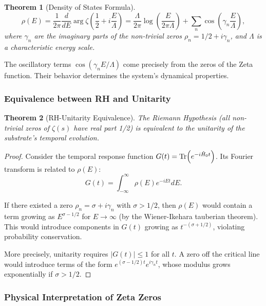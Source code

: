 \documentclass[11pt, a4paper]{article}
\theoremstyle{plain}
\newtheorem{theorem}{Theorem}[section]
\theoremstyle{definition}
\begin{document}
\begin{theorem}[Density of States Formula]
\begin{equation}
\rho(E) = \frac{1}{2\pi} \frac{d}{dE} \arg \zeta\left(\frac{1}{2} + i\frac{E}{\Lambda}\right) = \frac{\Lambda}{2\pi} \log\left(\frac{E}{2\pi\Lambda}\right) + \sum_n \cos\left(\gamma_n \frac{E}{\Lambda}\right),
\label{eq:density_of_states}
\end{equation}
where $\gamma_n$ are the imaginary parts of the non-trivial zeros $\rho_n = 1/2 + i\gamma_n$, and $\Lambda$ is a characteristic energy scale.
\end{theorem}

The oscillatory terms $\cos(\gamma_n E/\Lambda)$ come precisely from the zeros of the Zeta function. Their behavior determines the system's dynamical properties.

\subsubsection{Equivalence between RH and Unitarity}

\begin{theorem}[RH-Unitarity Equivalence]
The Riemann Hypothesis (all non-trivial zeros of $\zeta(s)$ have real part 1/2) is equivalent to the unitarity of the substrate's temporal evolution.
\end{theorem}

\begin{proof}
Consider the temporal response function $G(t) = \Tr(e^{-i\hat{H}_0 t})$. Its Fourier transform is related to $\rho(E)$:
\begin{equation}
G(t) = \int_{-\infty}^\infty \rho(E) e^{-iEt} dE.
\end{equation}

If there existed a zero $\rho_n = \sigma + i\gamma_n$ with $\sigma > 1/2$, then $\rho(E)$ would contain a term growing as $E^{\sigma-1/2}$ for $E \to \infty$ (by the Wiener-Ikehara tauberian theorem). This would introduce components in $G(t)$ growing as $t^{-(\sigma+1/2)}$, violating probability conservation.

More precisely, unitarity requires $|G(t)| \leq 1$ for all $t$. A zero off the critical line would introduce terms of the form $e^{(\sigma-1/2)t} e^{i\gamma_n t}$, whose modulus grows exponentially if $\sigma > 1/2$.
\end{proof}

\subsubsection{Physical Interpretation of Zeta Zeros}
\end{document}
